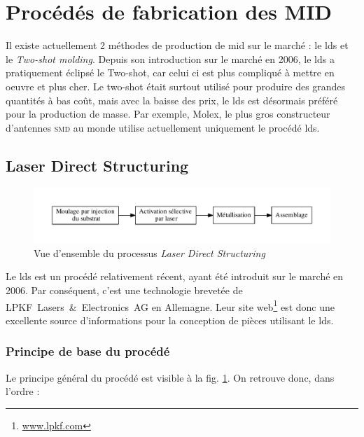 \section{Procédés de fabrication des MID}
Il existe actuellement 2 méthodes de production de \gls{mid} sur le marché : le \gls{lds} et le \emph{Two-shot molding}.
Depuis son introduction sur le marché en 2006, le \gls{lds} a pratiquement éclipsé le Two-shot, car celui ci est plus compliqué à mettre en oeuvre et plus cher.
Le two-shot était surtout utilisé pour produire des grandes quantités à bas coût, mais avec la baisse des prix, le \gls{lds} est désormais préféré pour la production de masse.
Par exemple, Molex, le plus gros constructeur d'antennes \textsc{smd} au monde utilise actuellement uniquement le procédé \gls{lds}.

\subsection{Laser Direct Structuring}
\begin{figure}[h]
    \begin{center}
        \includegraphics[width=\textwidth]{images/lds_process}
        \caption{Vue d'ensemble du processus \emph{Laser Direct Structuring}}\label{fig:lds-process}
    \end{center}
\end{figure}
Le \gls{lds} est un procédé relativement récent, ayant été introduit sur le marché en 2006.
Par conséquent, c'est une technologie brevetée de LPKF~Lasers~\&~Electronics~AG en Allemagne.
Leur site web\footnote{\url{www.lpkf.com}} est donc une excellente source d'informations pour la conception de pièces utilisant le \gls{lds}.

\subsubsection{Principe de base du procédé}
Le principe général du procédé est visible à la fig.
\ref{fig:lds-process}.
On retrouve donc, dans l'ordre :

